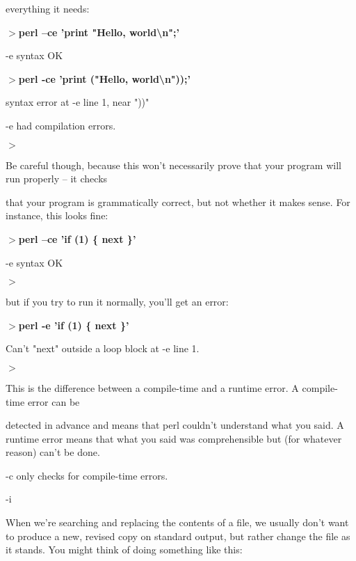 \documentclass[a4paper,11pt]{book}
\begin{document}
\noindent everything it needs:

\noindent 

\noindent $>$\textbf{perl --ce 'print "Hello, world\textbackslash n";'}

\noindent -e syntax OK

\noindent $>$\textbf{perl -ce 'print ("Hello, world\textbackslash n"));'}

\noindent syntax error at -e line 1, near "))"

\noindent -e had compilation errors.

\noindent $>$

\noindent 

\noindent Be careful though, because this won't necessarily prove that your program will run properly -- it checks

\noindent that your program is grammatically correct, but not whether it makes sense. For instance, this looks fine:

\noindent 

\noindent $>$\textbf{perl --ce 'if (1) \{ next \}'}

\noindent -e syntax OK

\noindent $>$

\noindent 

\noindent but if you try to run it normally, you'll get an error:

\noindent 

\noindent $>$\textbf{perl -e 'if (1) \{ next \}'}

\noindent Can't "next" outside a loop block at -e line 1.

\noindent $>$

\noindent 

\noindent This is the difference between a compile-time and a runtime error. A compile-time error can be

\noindent detected in advance and means that perl couldn't understand what you said. A runtime error means that what you said was comprehensible but (for whatever reason) can't be done.

\noindent -c only checks for compile-time errors.

\noindent 

\noindent 

\noindent -i

\noindent 

\noindent When we're searching and replacing the contents of a file, we usually don't want to produce a new, revised copy on standard output, but rather change the file as it stands. You might think of doing something like this:
\end{document}
